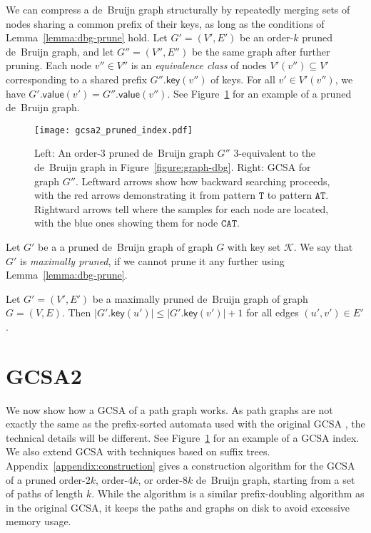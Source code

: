 \documentclass[a4paper,11pt]{llncs}
\newcommand{\abs}[1]{\ensuremath{\lvert #1 \rvert}}
\newcommand{\gkey}{\ensuremath{\mathsf{key}}}
\newcommand{\gvalue}{\ensuremath{\mathsf{value}}}
\newcommand{\kequivalent}[1]{$#1$\nobreakdash-equivalent}
\newcommand{\orderk}[1]{order\nobreakdash-$#1$}
\begin{document}
We can compress a de~Bruijn graph structurally by repeatedly merging sets of nodes sharing a common prefix of their keys, as long as the conditions of Lemma~\ref{lemma:dbg-prune} hold. Let $G' = (V', E')$ be an \orderk{k} pruned de~Bruijn graph, and let $G'' = (V'', E'')$ be the same graph after further pruning. Each node $v'' \in V''$ is an \emph{equivalence class} of nodes $V'(v'') \subseteq V'$ corresponding to a shared prefix $G''.\gkey(v'')$ of keys. For all $v' \in V'(v'')$, we have $G'.\gvalue(v') = G''.\gvalue(v'')$. See Figure~\ref{figure:pruned-index} for an example of a pruned de~Bruijn graph.

\begin{figure}[t!]
\texttt{[image: gcsa2\_pruned\_index.pdf]}
\caption{Left: An \protect\orderk{3} pruned de~Bruijn graph $G''$ \protect\kequivalent{3} to the de~Bruijn graph in Figure~\ref{figure:graph-dbg}. Right: GCSA for graph $G''$. Leftward arrows show how backward searching proceeds, with the red arrows demonstrating it from pattern $\mathtt{T}$ to pattern $\mathtt{AT}$. Rightward arrows tell where the samples for each node are located, with the blue ones showing them for node $\mathtt{CAT}$.}\label{figure:pruned-index}
\end{figure}

\begin{definition}
Let $G'$ be a a pruned de~Bruijn graph of graph $G$ with key set $\mathcal{K}$. We say that $G'$ is \emph{maximally pruned}, if we cannot prune it any further using Lemma~\ref{lemma:dbg-prune}.
\end{definition}

\begin{lemma}\label{lemma:dbg-maximal}
Let $G' = (V', E')$ be a maximally pruned de~Bruijn graph of graph $G = (V, E)$. Then $\abs{G'.\gkey(u')} \le \abs{G'.\gkey(v')}+1$ for all edges $(u', v') \in E'$.
\end{lemma}


\section{GCSA2}

We now show how a GCSA of a path graph works. As path graphs are not exactly the same as the prefix-sorted automata used with the original GCSA \cite{Siren2014}, the technical details will be different.
See Figure~\ref{figure:pruned-index} for an example of a GCSA index.
We also extend GCSA with techniques based on suffix trees.
Appendix~\ref{appendix:construction} gives a construction algorithm for the GCSA of a pruned \orderk{2k}, \orderk{4k}, or \orderk{8k} de~Bruijn graph, starting from a set of paths of length $k$. While the algorithm is a similar prefix-doubling algorithm as in the original GCSA, it keeps the paths and graphs on disk to avoid excessive memory usage.
\end{document}

